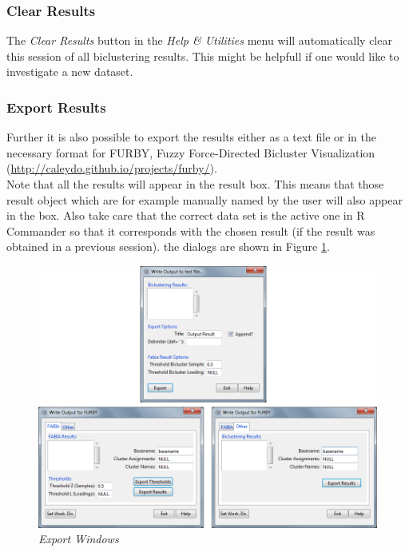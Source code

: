 \documentclass[a4paper]{article}\usepackage[]{graphicx}\usepackage[]{color}
\begin{document}
\subsubsection{Clear Results}
The {\it Clear Results} button in the {\it Help \& Utilities} menu will
automatically clear this session of all biclustering results. This might be
helpfull if one would like to investigate a new dataset.

\subsubsection{Export Results}
Further it is also possible to export the results either as a text file or in
the necessary format for FURBY, Fuzzy Force-Directed Bicluster Visualization (\url{http://caleydo.github.io/projects/furby/}). \\
Note that all the results will appear in the result box. This means that those
result object which are for example manually named by the user will also appear
in the box. Also take care that the correct data set is the active one in R
Commander so that it corresponds with the chosen result (if the result was
obtained in a previous session). the dialogs are shown in Figure
\ref{exportwindows}.

\begin{figure}[H]
\centering
\includegraphics[scale=0.5]{figures/exportwindows.png}
\caption{{\it Export Windows}\label{exportwindows}}
\end{figure}
\end{document}
